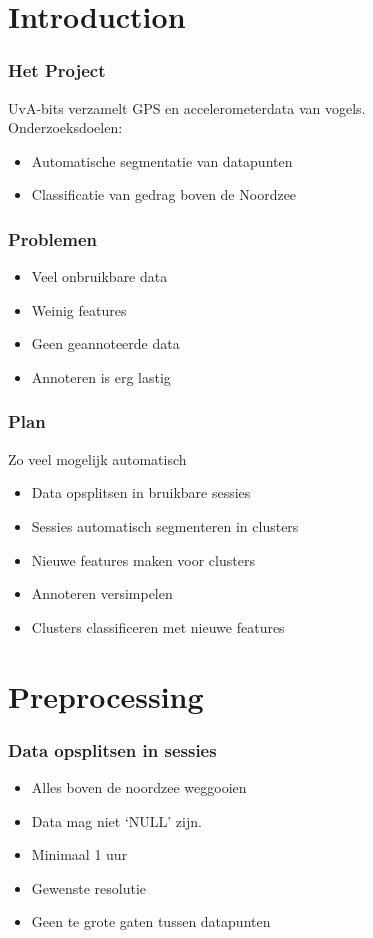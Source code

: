 \documentclass{beamer}
\title{\projectName}
\subtitle{\projectAbbreviation}
\author{Jesse Eisses, Sosha Happel, Maarten Inja and Maarten de Waard}
\institute{UvA}
\newcommand{\slide}[2]
{
\begin{frame}
\frametitle{#1} 

#2

\end{frame}
}
\begin{document}
\begin{frame}
\titlepage
\end{frame}



\section{Introduction}
\slide{Het Project}
{
UvA-bits verzamelt GPS en accelerometerdata van vogels.\\
Onderzoeksdoelen:
\begin{itemize}
	\item Automatische segmentatie van datapunten
	\item Classificatie van gedrag boven de Noordzee
\end{itemize} 
}

\slide{Problemen}
{
\begin{itemize}
	\item Veel onbruikbare data
	\item Weinig features
	\item Geen geannoteerde data
	\item Annoteren is erg lastig
\end{itemize} 
}

\slide{Plan}
{
Zo veel mogelijk automatisch
\begin{itemize}
	\item Data opsplitsen in bruikbare sessies
	\item Sessies automatisch segmenteren in clusters
	\item Nieuwe features maken voor clusters
	\item Annoteren versimpelen
	\item Clusters classificeren met nieuwe features
\end{itemize} 
}

\section{Preprocessing}
\slide{Data opsplitsen in sessies}
{
\begin{itemize}
    \item Alles boven de noordzee weggooien
    \item Data mag niet `NULL' zijn.
    \item Minimaal 1 uur
    \item Gewenste resolutie
    \item Geen te grote gaten tussen datapunten
\end{itemize}
}
\end{document}
